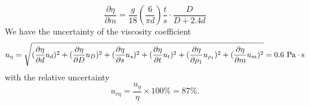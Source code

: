 \documentclass[a4paper]{report}
\begin{document}
	\begin{equation*}
	\dfrac{\partial\eta}{\partial m}=\dfrac{g}{18}(\dfrac{6}{\pi d})\dfrac{t}{s}\cdot\dfrac{D}{D+2.4d}
	\end{equation*}
	We have the uncertainty of the viscosity coefficient
	\begin{equation*}
	u_{\eta}=\sqrt{(\dfrac{\partial\eta}{\partial d}u_d)^2+(\dfrac{\partial\eta}{\partial D}u_D)^2+(\dfrac{\partial\eta}{\partial s}u_s)^2+(\dfrac{\partial\eta}{\partial t}u_t)^2+(\dfrac{\partial\eta}{\partial\rho_1}u_{\rho_1})^2+(\dfrac{\partial\eta}{\partial m}u_m)^2}=0.6\ \rm{Pa\cdot s}
	\end{equation*}
	with the relative uncertainty
	\begin{equation*}
	u_{r\eta}=\dfrac{u_{\eta}}{\eta}\times100\%=87\%.
	\end{equation*}
\end{document}

